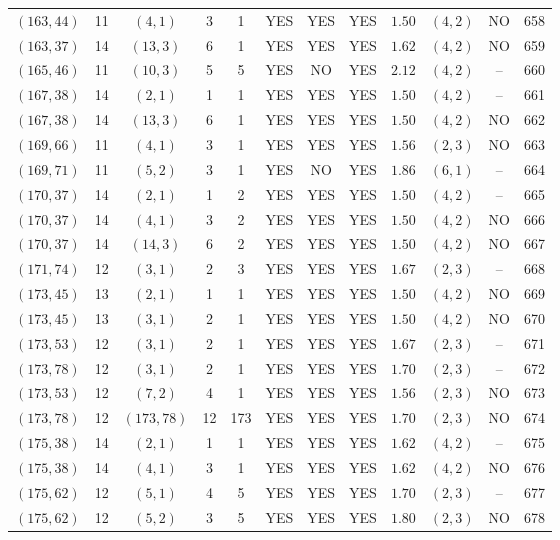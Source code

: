 \begin{longtable}{|c|c|c|c|c|c|c|c|c|c|c|c|}
$(163,44)$ & 11 & $(4,1)$ & 3 & 1 & YES & YES & YES & $1.50$ & $(4,2)$ & NO & 658\\
$(163,37)$ & 14 & $(13,3)$ & 6 & 1 & YES & YES & YES & $1.62$ & $(4,2)$ & NO & 659\\
$(165,46)$ & 11 & $(10,3)$ & 5 & 5 & YES & NO & YES & $2.12$ & $(4,2)$ & -- & 660\\
$(167,38)$ & 14 & $(2,1)$ & 1 & 1 & YES & YES & YES & $1.50$ & $(4,2)$ & -- & 661\\
$(167,38)$ & 14 & $(13,3)$ & 6 & 1 & YES & YES & YES & $1.50$ & $(4,2)$ & NO & 662\\
$(169,66)$ & 11 & $(4,1)$ & 3 & 1 & YES & YES & YES & $1.56$ & $(2,3)$ & NO & 663\\
$(169,71)$ & 11 & $(5,2)$ & 3 & 1 & YES & NO & YES & $1.86$ & $(6,1)$ & -- & 664\\
$(170,37)$ & 14 & $(2,1)$ & 1 & 2 & YES & YES & YES & $1.50$ & $(4,2)$ & -- & 665\\
$(170,37)$ & 14 & $(4,1)$ & 3 & 2 & YES & YES & YES & $1.50$ & $(4,2)$ & NO & 666\\
$(170,37)$ & 14 & $(14,3)$ & 6 & 2 & YES & YES & YES & $1.50$ & $(4,2)$ & NO & 667\\
$(171,74)$ & 12 & $(3,1)$ & 2 & 3 & YES & YES & YES & $1.67$ & $(2,3)$ & -- & 668\\
$(173,45)$ & 13 & $(2,1)$ & 1 & 1 & YES & YES & YES & $1.50$ & $(4,2)$ & NO & 669\\
$(173,45)$ & 13 & $(3,1)$ & 2 & 1 & YES & YES & YES & $1.50$ & $(4,2)$ & NO & 670\\
$(173,53)$ & 12 & $(3,1)$ & 2 & 1 & YES & YES & YES & $1.67$ & $(2,3)$ & -- & 671\\
$(173,78)$ & 12 & $(3,1)$ & 2 & 1 & YES & YES & YES & $1.70$ & $(2,3)$ & -- & 672\\
$(173,53)$ & 12 & $(7,2)$ & 4 & 1 & YES & YES & YES & $1.56$ & $(2,3)$ & NO & 673\\
$(173,78)$ & 12 & $(173,78)$ & 12 & 173 & YES & YES & YES & $1.70$ & $(2,3)$ & NO & 674\\
$(175,38)$ & 14 & $(2,1)$ & 1 & 1 & YES & YES & YES & $1.62$ & $(4,2)$ & -- & 675\\
$(175,38)$ & 14 & $(4,1)$ & 3 & 1 & YES & YES & YES & $1.62$ & $(4,2)$ & NO & 676\\
$(175,62)$ & 12 & $(5,1)$ & 4 & 5 & YES & YES & YES & $1.70$ & $(2,3)$ & -- & 677\\
$(175,62)$ & 12 & $(5,2)$ & 3 & 5 & YES & YES & YES & $1.80$ & $(2,3)$ & NO & 678\\

\end{longtable}
